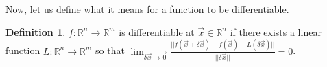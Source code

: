 \documentclass[11pt,leqno,oneside]{amsart}
\newcommand{\R}{{\mathbb R}} %
\theoremstyle{definition}
\newtheorem{defn}[thm]{Definition}
\numberwithin{equation}{section}
\begin{document}
Now, let us define what it means for a function to be differentiable.
\begin{defn}
    $f: \R^n \to \R^m$ is differentiable at $\vec{x} \in \R^n$ if there exists
    a linear function $L: \R^n \to \R^m$ so that $\lim_{\delta \vec{x} \to
    \vec{0}} \frac{||f(\vec{x}+\delta \vec{x}) - f(\vec{x}) - L(\delta
    \vec{x})||}{||\delta \vec{x}||} = 0$.
\end{defn}
\end{document}

